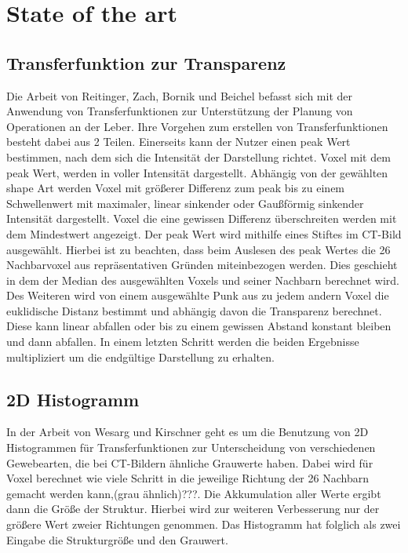 \documentclass{article}
\begin{document}
\section{State of the art}
\subsection{Transferfunktion zur Transparenz}

Die Arbeit von Reitinger, Zach, Bornik und Beichel befasst sich mit der Anwendung von Transferfunktionen zur Unterstützung der Planung von Operationen an der Leber. Ihre Vorgehen zum erstellen von Transferfunktionen besteht dabei aus 2 Teilen.
\newline
Einerseits kann der Nutzer einen peak Wert bestimmen, nach dem sich die Intensität der Darstellung richtet. Voxel mit dem peak Wert, werden in voller Intensität dargestellt. Abhängig von der gewählten shape Art werden Voxel mit größerer Differenz zum peak  bis zu einem Schwellenwert mit maximaler, linear sinkender oder Gaußförmig sinkender Intensität dargestellt. Voxel die eine gewissen Differenz überschreiten werden mit dem Mindestwert angezeigt.
Der peak Wert wird mithilfe eines Stiftes im CT-Bild ausgewählt. Hierbei ist zu beachten, dass beim Auslesen des peak Wertes die 26 Nachbarvoxel aus repräsentativen Gründen miteinbezogen werden. Dies geschieht in dem der Median des ausgewählten Voxels und seiner Nachbarn berechnet wird.
\newline
Des Weiteren wird von einem ausgewählte Punk aus zu jedem andern Voxel die euklidische Distanz bestimmt und abhängig davon die Transparenz berechnet. Diese kann linear abfallen oder bis zu einem gewissen Abstand konstant bleiben und dann abfallen.
\newline
In einem letzten Schritt werden die beiden Ergebnisse multipliziert um die endgültige Darstellung zu erhalten.


\subsection{2D Histogramm}

In der Arbeit von Wesarg und Kirschner geht es um die Benutzung von 2D Histogrammen für Transferfunktionen zur Unterscheidung von verschiedenen Gewebearten, die bei CT-Bildern ähnliche Grauwerte haben.
\newline
Dabei wird für Voxel berechnet wie viele Schritt in die jeweilige Richtung der 26 Nachbarn gemacht werden kann,(grau ähnlich)???. Die Akkumulation aller Werte ergibt dann die Größe der Struktur. Hierbei wird zur weiteren Verbesserung nur der größere Wert zweier Richtungen genommen.
\newline
Das Histogramm hat folglich als zwei Eingabe die Strukturgröße und den Grauwert. 
\end{document}
